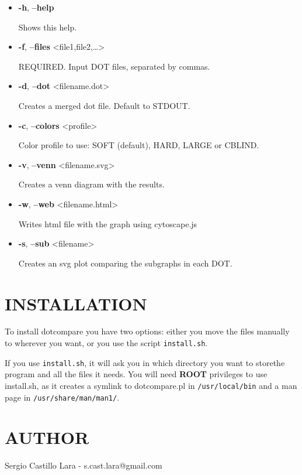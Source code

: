\documentclass[10pt]{article}
\begin{document}
\begin{itemize}
\item
  \textbf{-h}, \textbf{--help}

  Shows this help.
\item
  \textbf{-f}, \textbf{--files}
  \textless{}file1,file2,\ldots{}\textgreater{}

  REQUIRED. Input DOT files, separated by commas.
\item
  \textbf{-d}, \textbf{--dot} \textless{}filename.dot\textgreater{}

  Creates a merged dot file. Default to STDOUT.
\item
  \textbf{-c}, \textbf{--colors} \textless{}profile\textgreater{}

  Color profile to use: SOFT (default), HARD, LARGE or CBLIND.
\item
  \textbf{-v}, \textbf{--venn} \textless{}filename.svg\textgreater{}

  Creates a venn diagram with the results.
\item
  \textbf{-w}, \textbf{--web} \textless{}filename.html\textgreater{}

  Writes html file with the graph using cytoscape.js
\item
  \textbf{-s}, \textbf{--sub} \textless{}filename\textgreater{}

  Creates an svg plot comparing the subgraphs in each DOT.
\end{itemize}

\section{INSTALLATION}\label{installation}

To install dotcompare you have two options: either you move the files
manually to wherever you want, or you use the script
\texttt{install.sh}.

If you use \texttt{install.sh}, it will ask you in which directory you
want to storethe program and all the files it needs. You will need
\textbf{ROOT} privileges to use install.sh, as it creates a symlink to
dotcompare.pl in \texttt{/usr/local/bin} and a man page in
\texttt{/usr/share/man/man1/}.

\section{AUTHOR}\label{author}

Sergio Castillo Lara - s.cast.lara@gmail.com
\end{document}
